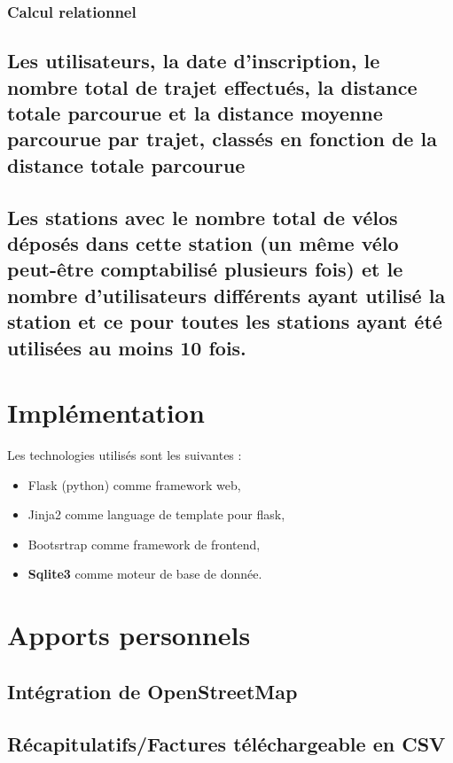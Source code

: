 \documentclass[a4paper,10pt]{article}
\begin{document}
\subsubsection{Calcul relationnel}

\subsection{Les utilisateurs, la date d'inscription, le nombre total de trajet effectués, la distance totale parcourue et la distance moyenne parcourue par trajet, classés en fonction de la distance totale parcourue}


\subsection{Les stations avec le nombre total de vélos déposés dans cette station (un même vélo peut-être comptabilisé plusieurs fois) et le nombre d'utilisateurs différents ayant utilisé la station et ce pour toutes les stations ayant été utilisées au moins 10 fois.}


\section{Implémentation}
Les technologies utilisés sont les suivantes :
\begin{itemize}
	\item Flask (python) comme framework web,
	\item Jinja2 comme language de template pour flask,
	\item Bootsrtrap comme framework de frontend,
	\item \textbf{Sqlite3} comme moteur de base de donnée.
\end{itemize}

\section{Apports personnels}

\subsection{Intégration de OpenStreetMap}

\subsection{Récapitulatifs/Factures téléchargeable en CSV} %
\end{document}
